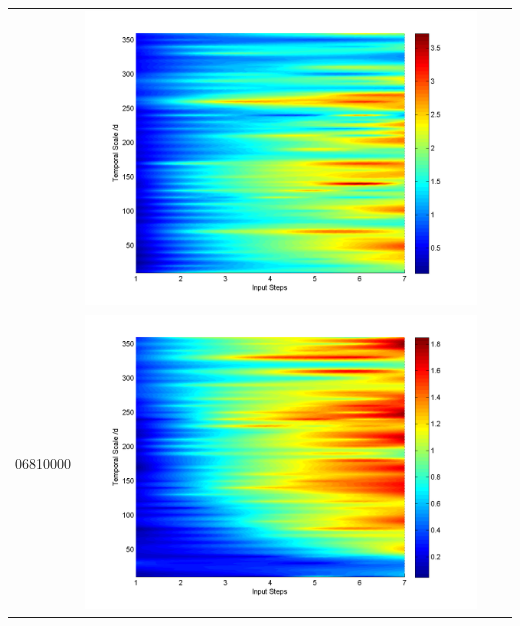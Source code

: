 \documentclass[11pt]{article}
\begin{document}
\begin{table}[H]
{\begin{tabular}{c  c   c   c  }
&\begin{minipage}{.3\textwidth}\includegraphics[width=\linewidth]{resultgraph/05484500pepq.png}\end{minipage}
\\
06810000
&\begin{minipage}{.3\textwidth}\includegraphics[width=\linewidth]{resultgraph/06810000p.png}\end{minipage}

\end{tabular}}
\end{table}
\end{document}
